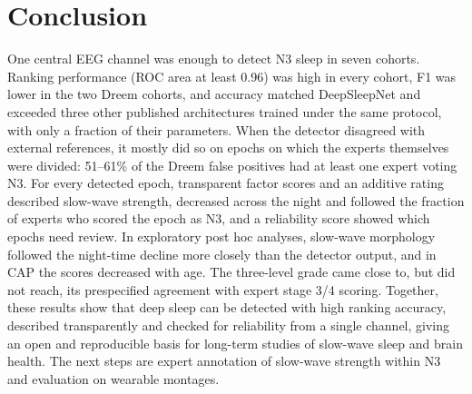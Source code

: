 \section{Conclusion}
One central EEG channel was enough to detect N3 sleep in seven cohorts. Ranking performance (ROC area at least 0.96) was high in every cohort, F1 was lower in the two Dreem cohorts, and accuracy matched DeepSleepNet and exceeded three other published architectures trained under the same protocol, with only a fraction of their parameters. When the detector disagreed with external references, it mostly did so on epochs on which the experts themselves were divided: 51--61\% of the Dreem false positives had at least one expert voting N3. For every detected epoch, transparent factor scores and an additive rating described slow-wave strength, decreased across the night and followed the fraction of experts who scored the epoch as N3, and a reliability score showed which epochs need review. In exploratory post hoc analyses, slow-wave morphology followed the night-time decline more closely than the detector output, and in CAP the scores decreased with age. The three-level grade came close to, but did not reach, its prespecified agreement with expert stage 3/4 scoring. Together, these results show that deep sleep can be detected with high ranking accuracy, described transparently and checked for reliability from a single channel, giving an open and reproducible basis for long-term studies of slow-wave sleep and brain health. The next steps are expert annotation of slow-wave strength within N3 and evaluation on wearable montages. %
